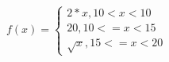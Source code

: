 \documentclass[12pt, letterpaper]{article}
\begin{document}
$f(x) = \left\{\begin{array}{l}
2*x, 10 < x < 10 \\
20, 10 <= x < 15 \\
\sqrt{x}, 15 <= x < 20 \end{array}\right.$
\end{document}
